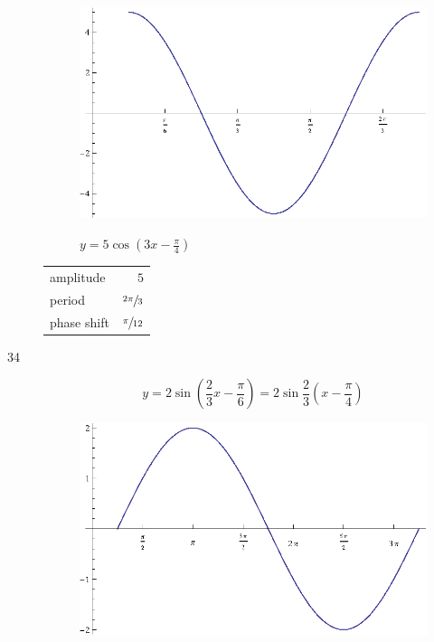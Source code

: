 \documentclass{exam}
\begin{document}
\begin{description}
        \begin{figure}[H]
          \centering
          \includegraphics[scale=0.8]{exercise33.eps}

          $y = 5 \cos \left( 3x - \frac{\pi}{4} \right)$
        \end{figure}

        \begin{tabular}[H]{lr}
          \toprule
          amplitude   & $5$ \\
          period      & $\sfrac{2 \pi}{3}$ \\
          phase shift & $\sfrac{\pi}{12}$ \\
          \bottomrule
        \end{tabular}

      \pagebreak

      \item[34]
        \[
          y = 2 \sin \left( \frac{2}{3} x - \frac{\pi}{6} \right) = 2 \sin \frac{2}{3} \left( x - \frac{\pi}{4} \right)
        \]

        \begin{figure}[H]
          \centering
          \includegraphics[scale=1.0]{exercise34.eps}


\end{figure}
\end{description}
\end{document}
